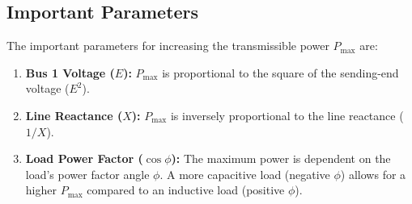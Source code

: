 \documentclass{article}
\begin{document}
\subsection*{Important Parameters}
The important parameters for increasing the transmissible power $P_{\text{max}}$ are:
\begin{enumerate}
    \item \textbf{Bus 1 Voltage ($E$):} $P_{\text{max}}$ is proportional to the square of the sending-end voltage ($E^2$).
    \item \textbf{Line Reactance ($X$):} $P_{\text{max}}$ is inversely proportional to the line reactance ($1/X$).
    \item \textbf{Load Power Factor ($\cos\phi$):} The maximum power is dependent on the load's power factor angle $\phi$. A more capacitive load (negative $\phi$) allows for a higher $P_{\text{max}}$ compared to an inductive load (positive $\phi$).
\end{enumerate}
\end{document}
